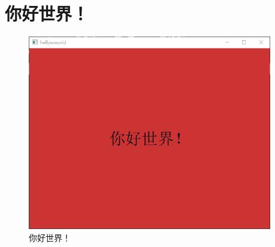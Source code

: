 ﻿





\FloatBarrier
\section{
你好世界！
}\label{s100410}




\begin{figure}[ht] %
\centering %
\includegraphics[width=0.95\textwidth]{../chapter01/hellowworld/the_app.png} %
\caption{你好世界！} %
\label{p000006} %
\end{figure}




